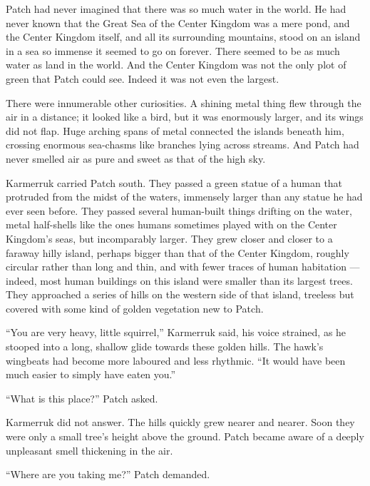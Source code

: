 \documentclass[ebook,oneside,openany,17pt]{memoir}
\newenvironment{tolerant}[1]{%
  \par\tolerance=#1\relax
}{%
  \par
}
\begin{document}
\begin{tolerant}{1000}
Patch had never imagined that there was so much water in the world. He
had never known that the Great Sea of the Center Kingdom was a mere
pond, and the Center Kingdom itself, and all its surrounding
mountains, stood on an island in a sea so immense it seemed to go on
forever. There seemed to be as much water as land in the world. And
the Center Kingdom was not the only plot of green that Patch could
see. Indeed it was not even the largest.
\end{tolerant}

There were innumerable other curiosities. A shining metal thing flew
through the air in a distance; it looked like a bird, but it was
enormously larger, and its wings did not flap. Huge arching spans of
metal connected the islands beneath him, crossing enormous sea-chasms
like branches lying across streams. And Patch had never smelled air as
pure and sweet as that of the high sky.

\begin{tolerant}{1000}
Karmerruk carried Patch south. They passed a green statue of a human
that protruded from the midst of the waters, immensely larger than any
statue he had ever seen before. They passed several human-built things
drifting on the water, metal half-shells like the ones humans
sometimes played with on the Center Kingdom’s seas, but incomparably
larger. They grew closer and closer to a faraway hilly island, perhaps
bigger than that of the Center Kingdom, roughly circular rather than
long and thin, and with fewer traces of human habitation — indeed,
most human buildings on this island were smaller than its largest
trees. They approached a series of hills on the western side of that
island, treeless but covered with some kind of golden vegetation new
to Patch.
\end{tolerant}

“You are very heavy, little squirrel,” Karmerruk said, his voice
strained, as he stooped into a long, shallow glide towards these
golden hills. The hawk’s wingbeats had become more laboured and less
rhythmic. “It would have been much easier to simply have eaten you.”

“What is this place?” Patch asked.

Karmerruk did not answer. The hills quickly grew nearer and
nearer. Soon they were only a small tree’s height above the
ground. Patch became aware of a deeply unpleasant smell thickening in
the air.

“Where are you taking me?” Patch demanded.
\end{document}
